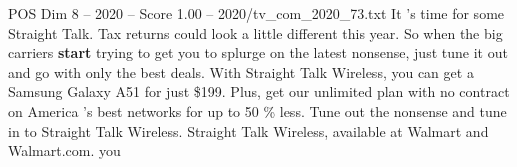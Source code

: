 \begin{textsample}{POS Dim 8 – 2020 – Score 1.00 – 2020/tv\_com\_2020\_73.txt}  \label{ex:f8_pos_027}
It 's time for some Straight Talk.
Tax returns could look a little different this year.
So when the big carriers \textbf{start} trying to get you to splurge on the latest nonsense, just tune it out and go with only the best deals.
With Straight Talk Wireless, you can get a Samsung Galaxy A51 for just \$199.
Plus, get our unlimited plan with no contract on America 's best networks for up to 50 \% less.
Tune out the nonsense and tune in to Straight Talk Wireless.
Straight Talk Wireless, available at Walmart and Walmart.com. you

\end{textsample}
